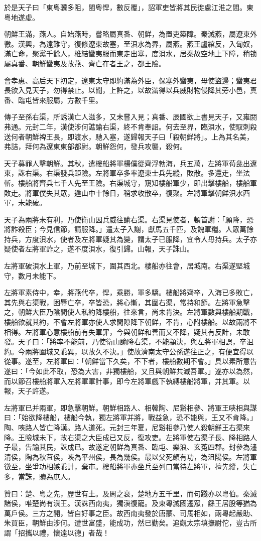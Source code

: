 \begin{pinyinscope}
於是天子曰「東粵骥多阻，閩粵悍，數反覆」，詔軍吏皆將其民徙處江淮之間。東粵地遂虛。

朝鮮王滿，燕人。自始燕時，嘗略屬真番、朝鮮，為置吏築障。秦滅燕，屬遼東外徼。漢興，為遠難守，復修遼東故塞，至浿水為界，屬燕。燕王盧綰反，入匈奴，滿亡命，聚黨千餘人，椎結蠻夷服而東走出塞，度浿水，居秦故空地上下障，稍锁屬真番、朝鮮蠻夷及故燕、齊亡在者王之，都王險。

會孝惠、高后天下初定，遼東太守即約滿為外臣，保塞外蠻夷，毋使盜邊；蠻夷君長欲入見天子，勿得禁止。以聞，上許之，以故滿得以兵威財物侵降其旁小邑，真番、臨屯皆來服屬，方數千里。

傳子至孫右渠，所誘漢亡人滋多，又未嘗入見；真番、辰國欲上書見天子，又雍閼弗通。元封二年，漢使涉何譙諭右渠，終不肯奉詔。何去至界，臨浿水，使馭刺殺送何者朝鮮裨王長，即渡水，馳入塞，遂歸報天子曰「殺朝鮮將」。上為其名美，弗詰，拜何為遼東東部都尉。朝鮮怨何，發兵攻襲，殺何。

天子募罪人擊朝鮮。其秋，遣樓船將軍楊僕從齊浮勃海，兵五萬，左將軍荀彘出遼東，誅右渠。右渠發兵距險。左將軍卒多率遼東士兵先縱，敗散。多還走，坐法斬。樓船將齊兵七千人先至王險。右渠城守，窺知樓船軍少，即出擊樓船，樓船軍敗走。將軍僕失其眾，遁山中十餘日，稍求收散卒，復聚。左將軍擊朝鮮浿水西軍，未能破。

天子為兩將未有利，乃使衛山因兵威往諭右渠。右渠見使者，頓首謝：「願降，恐將詐殺臣；今見信節，請服降。」遣太子入謝，獻馬五千匹，及餽軍糧。人眾萬餘持兵，方度浿水，使者及左將軍疑其為變，謂太子已服降，宜令人毋持兵。太子亦疑使者左將軍詐之，遂不度浿水，復引歸。山報，天子誅山。

左將軍破浿水上軍，乃前至城下，圍其西北。樓船亦往會，居城南。右渠遂堅城守，數月未能下。

左將軍素侍中，幸，將燕代卒，悍，乘勝，軍多驕。樓船將齊卒，入海已多敗亡，其先與右渠戰，困辱亡卒，卒皆恐，將心慚，其圍右渠，常持和節。左將軍急擊之，朝鮮大臣乃陰間使人私約降樓船，往來言，尚未肯決。左將軍數與樓船期戰，樓船欲就其約，不會左將軍亦使人求間隙降下朝鮮，不肯，心附樓船。以故兩將不相得。左將軍心意樓船前有失軍罪，今與朝鮮和善而又不降，疑其有反計，未敢發。天子曰：「將率不能前，乃使衛山諭降右渠，不能顓決，與左將軍相誤，卒沮約。今兩將圍城又乖異，以故久不決。」使故濟南太守公孫遂往正之，有便宜得以從事。遂至，左將軍曰：「朝鮮當下久矣，不下者，樓船數期不會。」具以素所意告遂曰：「今如此不取，恐為大害，非獨樓船，又且與朝鮮共滅吾軍。」遂亦以為然，而以節召樓船將軍入左將軍軍計事，即今左將軍戲下執縛樓船將軍，并其軍。以報，天子許遂。

左將軍已并兩軍，即急擊朝鮮。朝鮮相路人、相韓陶、尼谿相參、將軍王唊相與謀曰：「始欲降樓船，樓船今執，獨左將軍并將，戰益急，恐不能與，王又不肯降。」陶、唊路人皆亡降漢。路人道死。元封三年夏，尼谿相參乃使人殺朝鮮王右渠來降。王險城未下，故右渠之大臣成已又反，復攻吏。左將軍使右渠子長、降相路人子最，告諭其民，誅成已。故遂定朝鮮為真番、臨屯、樂浪、玄菟四郡。封參為澅清侯，陶為秋苴侯，唊為平州侯，長為幾侯。最以父死頗有功，為沮陽侯。左將軍徵至，坐爭功相嫉乖計，棄市。樓船將軍亦坐兵至列口當待左將軍，擅先縱，失亡多，當誅，贖為庶人。

贊曰：楚、粵之先，歷世有土。及周之衰，楚地方五千里，而句踐亦以粵伯。秦滅諸侯，唯楚尚有滇王。漢誅西南夷，獨滇復寵。及東粵滅國遷眾，繇王居股等猶為萬戶侯。三方之開，皆自好事之臣。故西南夷發於唐蒙、司馬相如，兩粵起嚴助、朱買臣，朝鮮由涉何。遭世富盛，能成功，然已勤矣。追觀太宗填撫尉佗，豈古所謂「招攜以禮，懷遠以德」者哉！


\end{pinyinscope}